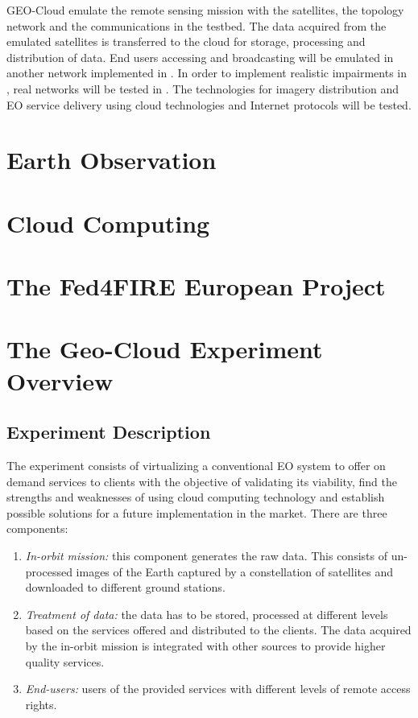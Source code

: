 GEO-Cloud  emulate the remote sensing mission with the satellites, the
topology network and the communications in the \vw testbed. The data
acquired from the emulated satellites is transferred to the \bonfire cloud
for storage, processing and distribution of data. End users accessing and
broadcasting will be emulated in another network implemented in \vw. In
order to implement realistic impairments in \vw, real networks will be
tested in \pl.  The technologies for imagery distribution and \ac{EO}
service delivery using cloud technologies and Internet protocols will be tested.

\section{Earth Observation}


\section{Cloud Computing}


\section{The Fed4FIRE European Project}


\section{The Geo-Cloud Experiment Overview}


\subsection{Experiment Description}

The experiment consists of virtualizing a conventional \ac{EO} system to offer on
demand services to clients with the objective of validating its viability, find
the strengths and weaknesses of using cloud computing technology and establish
possible solutions for a future implementation in the market. There are three
components:
\begin{enumerate}
\item \emph{In-orbit mission:} this component generates the raw data. This consists of un-processed images of the Earth captured by a constellation of satellites and downloaded to different ground stations.
\item \emph{Treatment of data:} the data has to be stored, processed at different levels based on the services offered and distributed to the clients. The data acquired by the in-orbit mission is integrated with other sources to provide higher quality services.
\item \emph{End-users:} users of the provided services with different levels of remote access rights.

\end{enumerate}


